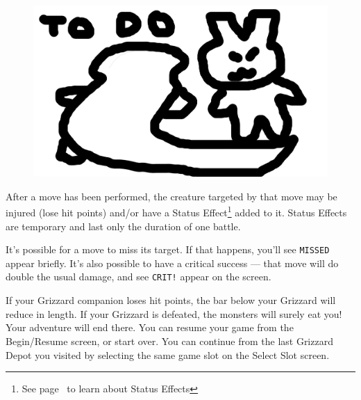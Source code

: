 \documentclass[10pt,twocolumn,openany,article]{memoir}
\begin{document}
\begin{figure}[b]
  \begin{center}
    \includegraphics[width=2\columnwidth,height=\columnwidth]{../Manual/GrizzardCombat.png}
  \end{center}
\end{figure}

After a move has been performed,  the creature targeted by that move may
be injured  (lose hit points)  and/or have a  Status Effect\footnote{See
  page~\pageref{sec:StatusEffects} to learn  about Status Effects} added
to  it. Status  Effects  are temporary  and last  only  the duration  of
one battle.

It's possible for a move to miss its target. If that happens, you'll see
\texttt{MISSED} appear  briefly. It's also  possible to have  a critical
success  ---  that  move  will  do double  the  usual  damage,  and  see
\texttt{CRIT!} appear on the screen.

If your Grizzard companion loses hit points, the bar below your Grizzard
will reduce in  length. If your Grizzard is defeated,  the monsters will
surely eat you! Your adventure will end there. \ifdefined\NOSAVE You can
resume your game from the Begin/Resume  screen, or start over. \else You
can continue from  the last Grizzard Depot you visited  by selecting the
same game slot on the Select Slot screen. \fi
\end{document}
